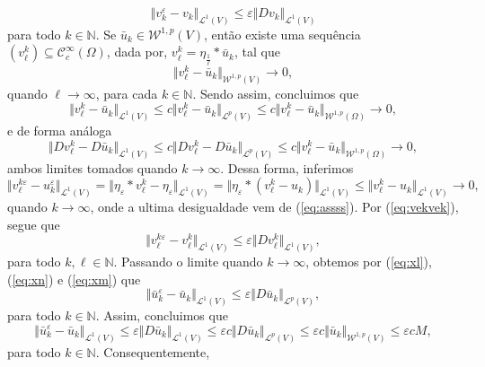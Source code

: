 \documentclass[a4paper, 11pt]{book}
\theoremstyle{definition}
\newcommand{\bN}{\mathbb{N}}
\newcommand{\cC}{\mathcal{C}}
\newcommand{\cL}{\mathcal{L}}
\newcommand{\cW}{\mathcal{W}}
\begin{document}
\begin{prf}
\begin{equation}
        \Vert v_k^\varepsilon - v_k \Vert_{\cL^1(V)} \leqslant \varepsilon \Vert Dv_k \Vert_{\cL^1(V)}
    \end{equation}
    para todo $k \in \bN$. Se $\bar u_k \in \cW^{1,p}(V)$, então existe uma sequência $(v^k_\ell) \subseteq \cC^{\infty}_c(\Omega)$, dada por, $v^k_\ell = \eta_{\frac{1}{\ell}} * \bar{u}_k$, tal que
    \[
        \Vert v^k_\ell - \bar{u}_k \Vert_{\cW^{1,p}(V)} \to 0,
    \]
    quando $\ell \to \infty$, para cada $k \in \bN$.
    Sendo assim, concluimos que
    \begin{equation} \label{eq:xl}
        \Vert v^k_\ell - \bar{u}_k \Vert_{\cL^1(V)} \leqslant c \Vert v^k_\ell - \bar{u}_k \Vert_{\cL^p(V)} \leqslant c \Vert v^k_\ell - \bar{u}_k \Vert_{\cW^{1,p}(\Omega)} \to 0,
    \end{equation}
    e de forma análoga
    \begin{equation} \label{eq:xn}
        \Vert Dv^k_\ell - D\bar{u}_k \Vert_{\cL^1(V)}\leqslant c \Vert Dv^k_\ell - D\bar{u}_k \Vert_{\cL^p(V)} \leqslant c \Vert v^k_\ell - \bar{u}_k \Vert_{\cW^{1,p}(\Omega)} \to 0,
    \end{equation}
    ambos limites tomados quando $k \to \infty$. Dessa forma, inferimos
    \begin{equation} \label{eq:xm}
        \Vert v^{k\varepsilon}_\ell - u_k^{\varepsilon} \Vert_{\cL^1(V)} = \Vert \eta_\varepsilon * v^k_\ell - \eta_\varepsilon \Vert_{\cL^1(V)} = \Vert \eta_\varepsilon  * (v^k_\ell - u_k) \Vert_{\cL^1(V)} \leqslant \Vert v^k_\ell - u_k \Vert_{\cL^1(V)} \to 0,
    \end{equation}
    quando $k \to \infty$, onde a ultima desigualdade vem de (\ref{eq:assss}).
    Por (\ref{eq:vekvek}), segue que
    \[
        \Vert v^{k\varepsilon}_\ell - v^k_\ell \Vert_{\cL^1(V)} \leqslant \varepsilon \Vert D v^k_\ell \Vert_{\cL^1(V)},
    \]
    para todo $k,\ell \in \bN$. Passando o limite quando $k \to \infty$, obtemos por (\ref{eq:xl}), (\ref{eq:xn}) e (\ref{eq:xm}) que
    \[
        \Vert \bar u_k^\varepsilon - \bar u_k \Vert_{\cL^1(V)} \leqslant \varepsilon \Vert D\bar u_k \Vert_{\cL^p(V)},
    \]
    para todo $k \in \bN$. Assim, concluimos que
    \[
        \Vert \bar u_k^\varepsilon - \bar u_k \Vert_{\cL^1(V)} \leqslant \varepsilon \Vert D\bar u_k \Vert_{\cL^1(V)} \leqslant \varepsilon c \Vert D\bar u_k \Vert_{\cL^p(V)} \leqslant \varepsilon c \Vert \bar u_k \Vert_{\cW^{1,p}(V)} \leqslant \varepsilon c M,
    \]
    para todo $k \in \bN$. Consequentemente,
    \begin{equation} \label{eq:eml1converge2}

\end{equation}
\end{prf}
\end{document}
